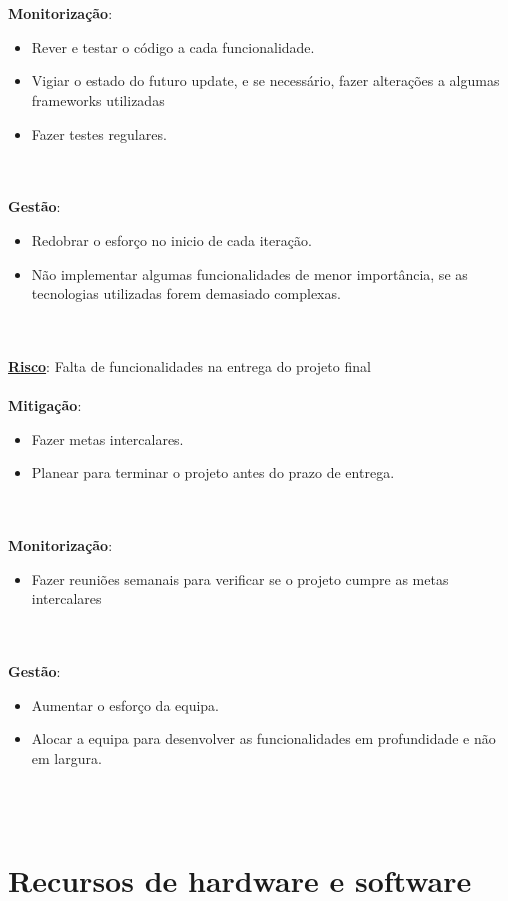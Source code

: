\documentclass[12pt, a4paper, twoside]{report} %
\begin{document}
\\
\\
\textbf{Monitorização}:
\begin{itemize}
\item Rever e testar o código a cada funcionalidade.
\item Vigiar o estado do futuro update, e se necessário, fazer alterações a algumas frameworks utilizadas
\item Fazer testes regulares.
\end{itemize}
\\
\\
\textbf{Gestão}:
\begin{itemize}
\item Redobrar o esforço no inicio de cada iteração.
\item Não implementar algumas funcionalidades de menor importância, se as tecnologias utilizadas forem demasiado complexas.
\end{itemize}
\\
\\
\noindent \underline{\textbf{Risco}}: Falta de funcionalidades na entrega do projeto final
\\
\\
\textbf{Mitigação}:
\begin{itemize}
\item Fazer metas intercalares.
\item Planear para terminar o projeto antes do prazo de entrega.
\end{itemize}
\\
\\
\textbf{Monitorização}:
\begin{itemize}
\item Fazer reuniões semanais para verificar se o projeto cumpre as metas intercalares
\end{itemize}
\\
\\
\textbf{Gestão}:
\begin{itemize}
\item Aumentar o esforço da equipa.
\item Alocar a equipa para desenvolver as funcionalidades em profundidade e não em largura.
\end{itemize}
\\
\\
\clearpage

\chapter{Recursos de hardware e software}
\end{document}
